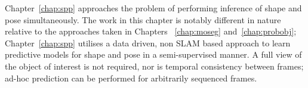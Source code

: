Chapter~\ref{chap:spp} approaches the problem of performing inference of shape and pose simultaneously. 
The work in this chapter is notably different in nature relative to the approaches taken in Chapters
~\ref{chap:moseg} and~\ref{chap:probobj}; Chapter~\ref{chap:spp} utilises a data driven, non SLAM based 
approach to learn predictive models for shape and pose in a semi-supervised manner. A full view of the 
object of interest is not required, nor is temporal consistency between frames; ad-hoc prediction can be 
performed for arbitrarily sequenced frames.